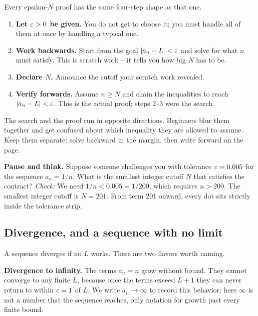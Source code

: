 \begin{whybox}
Every epsilon-$N$ proof has the same four-step shape as that one.
\begin{enumerate}
  \item \textbf{Let $\varepsilon > 0$ be given.} You do not get to choose it; you must
        handle all of them at once by handling a typical one.
  \item \textbf{Work backwards.} Start from the goal $\lvert a_n - L\rvert < \varepsilon$ and
        solve for what $n$ must satisfy. This is scratch work -- it tells you how
        big $N$ has to be.
  \item \textbf{Declare $N$.} Announce the cutoff your scratch work revealed.
  \item \textbf{Verify forwards.} Assume $n \ge N$ and chain the inequalities to
        reach $\lvert a_n - L\rvert < \varepsilon$. This is the actual proof; steps 2--3 were
        the search.
\end{enumerate}
The search and the proof run in opposite directions. Beginners blur them
together and get confused about which inequality they are allowed to assume.
Keep them separate: solve backward in the margin, then write forward on the page.
\end{whybox}

\begin{recoverybox}
\textbf{Pause and think.} Suppose someone challenges you with tolerance $\varepsilon = 0.005$ for the sequence $a_n = 1/n$. What is the smallest integer cutoff $N$ that satisfies the contract? 
\emph{Check:} We need $1/n < 0.005 = 1/200$, which requires $n > 200$. The smallest integer cutoff is $N = 201$. From term $201$ onward, every dot sits strictly inside the tolerance strip.
\end{recoverybox}

\subsection*{Divergence, and a sequence with no limit}

A sequence diverges if no $L$ works. There are two flavors worth naming.

\textbf{Divergence to infinity.} The terms $a_n = n$ grow without bound. They
cannot converge to any finite $L$, because once the terms exceed $L + 1$ they can
never return to within $\varepsilon = 1$ of $L$. We write $a_n \to \infty$ to record this
behavior; here $\infty$ is not a number that the sequence reaches, only notation for
growth past every finite bound.

